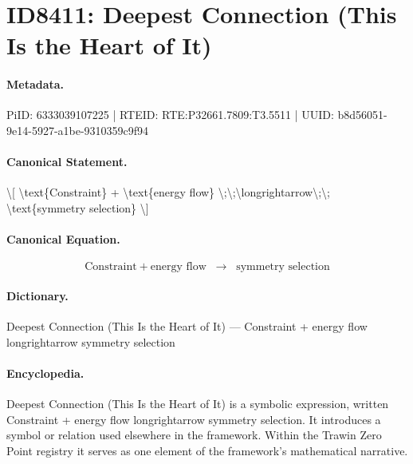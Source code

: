 \section*{ID8411: Deepest Connection (This Is the Heart of It)}
\paragraph{Metadata.}
PiID: 6333039107225 | RTEID: RTE:P32661.7809:T3.5511 | UUID: b8d56051-9e14-5927-a1be-9310359c9f94

\paragraph{Canonical Statement.}
\textbackslash{}[ \textbackslash{}text\{Constraint\} + \textbackslash{}text\{energy flow\} \textbackslash{};\textbackslash{};\textbackslash{}longrightarrow\textbackslash{};\textbackslash{}; \textbackslash{}text\{symmetry selection\} \textbackslash{}]

\paragraph{Canonical Equation.}
\[
\text{Constraint} + \text{energy flow} \;\;\longrightarrow\;\; \text{symmetry selection}
\]

\paragraph{Dictionary.}
Deepest Connection (This Is the Heart of It) — Constraint + energy flow longrightarrow symmetry selection

\paragraph{Encyclopedia.}
Deepest Connection (This Is the Heart of It) is a symbolic expression, written Constraint + energy flow longrightarrow symmetry selection. It introduces a symbol or relation used elsewhere in the framework. Within the Trawin Zero Point registry it serves as one element of the framework's mathematical narrative.

